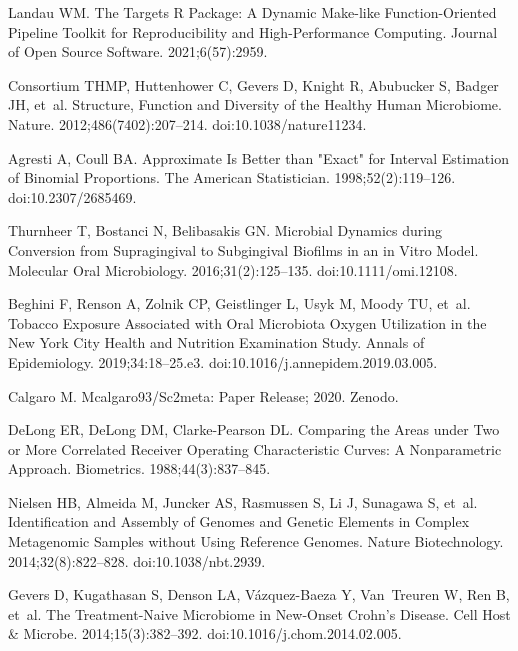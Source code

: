 \documentclass[10pt,letterpaper]{article}
\begin{document}
\begin{thebibliography}{10}
Landau WM.
\newblock The Targets {{R}} Package: A Dynamic {{Make-like}} Function-Oriented
  Pipeline Toolkit for Reproducibility and High-Performance Computing.
\newblock Journal of Open Source Software. 2021;6(57):2959.

Consortium THMP, Huttenhower C, Gevers D, Knight R, Abubucker S, Badger JH,
  et~al.
\newblock Structure, Function and Diversity of the Healthy Human Microbiome.
\newblock Nature. 2012;486(7402):207--214.
\newblock doi:{10.1038/nature11234}.

Agresti A, Coull BA.
\newblock Approximate {{Is Better}} than "{{Exact}}" for {{Interval
  Estimation}} of {{Binomial Proportions}}.
\newblock The American Statistician. 1998;52(2):119--126.
\newblock doi:{10.2307/2685469}.

Thurnheer T, Bostanci N, Belibasakis GN.
\newblock Microbial Dynamics during Conversion from Supragingival to
  Subgingival Biofilms in an in Vitro Model.
\newblock Molecular Oral Microbiology. 2016;31(2):125--135.
\newblock doi:{10.1111/omi.12108}.

Beghini F, Renson A, Zolnik CP, Geistlinger L, Usyk M, Moody TU, et~al.
\newblock Tobacco Exposure Associated with Oral Microbiota Oxygen Utilization
  in the {{New York City Health}} and {{Nutrition Examination Study}}.
\newblock Annals of Epidemiology. 2019;34:18--25.e3.
\newblock doi:{10.1016/j.annepidem.2019.03.005}.

Calgaro M. Mcalgaro93/Sc2meta: {{Paper Release}}; 2020.
\newblock Zenodo.

DeLong ER, DeLong DM, {Clarke-Pearson} DL.
\newblock Comparing the Areas under Two or More Correlated Receiver Operating
  Characteristic Curves: A Nonparametric Approach.
\newblock Biometrics. 1988;44(3):837--845.

Nielsen HB, Almeida M, Juncker AS, Rasmussen S, Li J, Sunagawa S, et~al.
\newblock Identification and Assembly of Genomes and Genetic Elements in
  Complex Metagenomic Samples without Using Reference Genomes.
\newblock Nature Biotechnology. 2014;32(8):822--828.
\newblock doi:{10.1038/nbt.2939}.

Gevers D, Kugathasan S, Denson LA, {V{\'a}zquez-Baeza} Y, Van~Treuren W, Ren B,
  et~al.
\newblock The {{Treatment-Naive Microbiome}} in {{New-Onset Crohn}}'s
  {{Disease}}.
\newblock Cell Host \& Microbe. 2014;15(3):382--392.
\newblock doi:{10.1016/j.chom.2014.02.005}.


\end{thebibliography}
\end{document}
